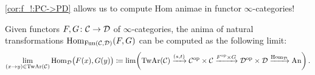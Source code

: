 \cref{cor:f_!:PC->PD} allows us to compute Hom animae in functor $\infty$-categories!
\begin{cor}\label{cor:HomInFunctorCats}
	Given functors $F,G\colon \mathcal{C}\rightarrow\mathcal{D}$ of $\infty$-categories, the anima of natural transformations $\operatorname{Hom}_{\operatorname{Fun}(\mathcal{C},\mathcal{D})}(F,G)$ can be computed as the following limit:
	\begin{equation*}
		\limit_{(x\rightarrow y)\in\TwAr(\Cc)}\Hom_\Dd\bigl(F(x),G(y)\bigr)\coloneqq \limit\left(\TwAr(\Cc)\xrightarrow{\!(s,t)\!}\Cc^\op\times\Cc\xrightarrow{\!F^\op\times G\!}\Dd^\op\times\Dd\xrightarrow{\!\Hom_\Dd\!}\cat{An}\right)\,.
	\end{equation*}
\end{cor}
